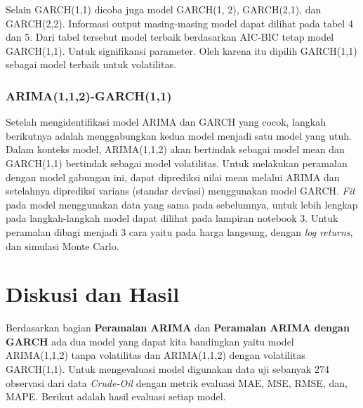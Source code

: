 \documentclass[a4paper,12pt]{article}
\begin{document}
\vspace{0.5cm}

Selain GARCH(1,1) dicoba juga model GARCH(1, 2), GARCH(2,1), dan GARCH(2,2). Informasi output masing-masing model dapat dilihat pada tabel 4 dan 5. Dari tabel tersebut model terbaik berdasarkan AIC-BIC tetap model GARCH(1,1). Untuk signifikansi parameter. Oleh karena itu dipilih GARCH(1,1) sebagai model terbaik untuk volatilitas.

\subsubsection{ARIMA(1,1,2)-GARCH(1,1)}

Setelah mengidentifikasi model ARIMA dan GARCH yang cocok, langkah berikutnya adalah menggabungkan kedua model menjadi satu model yang utuh. Dalam konteks model, ARIMA(1,1,2) akan bertindak sebagai model mean dan GARCH(1,1) bertindak sebagai model volatilitas. Untuk melakukan peramalan dengan model gabungan ini, dapat diprediksi nilai mean melalui ARIMA dan setelahnya diprediksi varians (standar deviasi) menggunakan model GARCH. \textit{Fit} pada model menggunakan data yang sama pada sebelumnya, untuk lebih lengkap pada langkah-langkah model dapat dilihat pada lampiran notebook 3. Untuk peramalan dibagi menjadi 3 cara yaitu pada harga langsung, dengan \textit{log returns}, dan simulasi Monte Carlo.

\section{Diskusi dan Hasil}

Berdasarkan bagian \textbf{Peramalan ARIMA} dan \textbf{Peramalan ARIMA dengan GARCH} ada dua model yang dapat kita bandingkan yaitu model ARIMA(1,1,2) tanpa volatilitas dan ARIMA(1,1,2) dengan volatilitas GARCH(1,1). Untuk mengevaluasi model digunakan data uji sebanyak 274 observasi dari data \textit{Crude-Oil} dengan metrik evaluasi MAE, MSE, RMSE, dan, MAPE. Berikut adalah hasil evaluasi setiap model.
\end{document}
